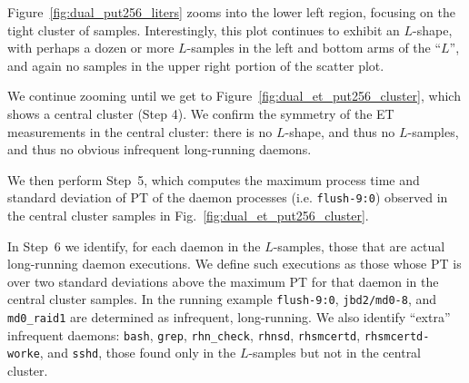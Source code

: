 \documentclass[letter]{ieice}
\begin{document}
Figure~\ref{fig:dual_put256_liters} zooms into the lower left region,
focusing on the
tight cluster of samples.  Interestingly, this plot continues to exhibit an
$L$-shape, with perhaps a dozen or more $L$-samples in the left and bottom arms of
the ``$L$'', and again no samples in the upper right portion of the
scatter plot.

We continue zooming until we get to Figure~\ref{fig:dual_et_put256_cluster},
which shows a central cluster (Step 4). 
We confirm the symmetry of the ET measurements in the central cluster: there
is no $L$-shape, and thus no $L$-samples, and thus no obvious infrequent
long-running daemons.

We then perform Step~5, which computes 
the maximum process time and standard deviation 
of PT of the daemon processes
(i.e. {\tt flush-9:0}) 
observed in the central cluster samples in Fig.~\ref{fig:dual_et_put256_cluster}. 

In Step~6 we identify, for each daemon in the \hbox{$L$-samples}, 
those that are actual long-running daemon
executions.  We define such executions as those whose PT 
is over two standard deviations above the maximum PT for
that daemon in the central cluster samples. 
In the running example  {\tt flush-9:0}, 
{\tt jbd2/md0-8}, and {\tt md0\_raid1} 
are determined as infrequent, long-running.
{\color{blue}We also identify ``extra'' infrequent daemons: 
{\tt bash}, {\tt grep}, {\tt rhn\_check}, {\tt rhnsd}, {\tt rhsmcertd}, 
{\tt rhsmcertd-worke}, and {\tt sshd}, those 
found only in the $L$-samples but not in the central cluster. 
}
\end{document}
